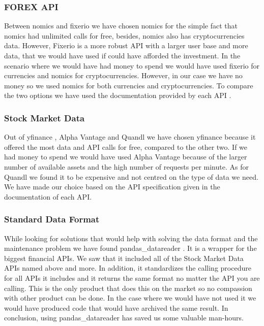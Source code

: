 \subsubsection*{FOREX API}
Between nomics \cite{nomics-python} and fixerio \cite{fixerio} we have chosen nomics for the simple fact that nomics had unlimited calls for free, besides, nomics also has cryptocurrencies data. However, Fixerio is a more robust API with a larger user base and more data, that we would have used if could have afforded the investment. In the scenario where we would have had money to spend we would have used fixerio for currencies and nomics for cryptocurrencies. However, in our case we have no money so we used nomics for both currencies and cryptocurrencies. To compare the two options we have used the documentation provided by each API . \newline

\subsubsection*{Stock Market Data}
Out of yfinance \cite{yfinance}, Alpha Vantage \cite{alphavantage}and Quandl \cite{quandl} we have chosen yfinance because it offered the most data and API calls for free, compared to the other two. If we had money to spend we would have used Alpha Vantage because of the larger number of available assets and the high number of requests per minute. As for Quandl we found it to be expensive and not centred on the type of data we need. We have made our choice based on the API specification given in the documentation of each API.\newline

\subsubsection*{Standard Data Format}
While looking for solutions that would help with solving the data format and the maintenance problem we have found pandas\_datareader \cite{pandas_datareader}. It is a wrapper for the biggest financial APIs. We saw that it included all of the Stock Market Data APIs named above and more. 
In addition, it standardizes the calling procedure for all APIs it includes and it returns the same format no matter the API you are calling. This is the only product that does this on the market so no compassion with other product can be done. In the case where we would have not used it we would have produced code that would have archived the same result. In conclusion, using pandas\_datareader has saved us some valuable man-hours.\newline
    
